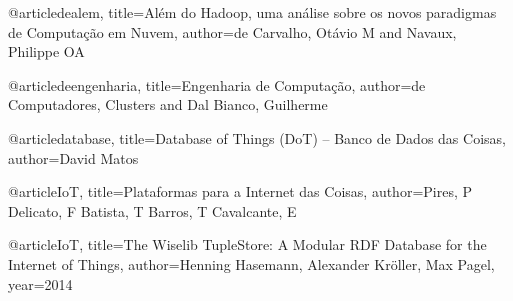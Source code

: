 @article{dealem,
  title={Al{\'e}m do Hadoop, uma an{\'a}lise sobre os novos paradigmas de Computa{\c{c}}{\~a}o em Nuvem},
  author={de Carvalho, Ot{\'a}vio M and Navaux, Philippe OA}
}

@article{deengenharia,
  title={Engenharia de Computa{\c{c}}{\~a}o},
  author={de Computadores, Clusters and Dal Bianco, Guilherme}
}

@article{database,
    title={Database of Things (DoT) – Banco de Dados das Coisas},
    author={David Matos}
}

@article{IoT,
    title={Plataformas para a Internet das Coisas},
    author={Pires, P Delicato, F Batista, T Barros, T Cavalcante, E}
}

@article{IoT,
    title={The Wiselib TupleStore: A Modular RDF Database for the Internet of Things},
    author={Henning Hasemann, Alexander Kröller, Max Pagel},
    year={2014}
}
